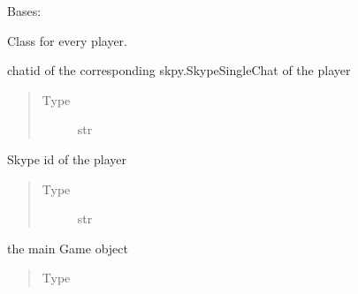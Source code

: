 \documentclass[letterpaper,10pt,english]{sphinxmanual}
\begin{document}
\begin{fulllineitems}
\label{\detokenize{chatwolf:chatwolf.player.Player}}
Bases: 

Class for every player.

\begin{fulllineitems}
\label{\detokenize{chatwolf:chatwolf.player.Player.chatid}}
chatid of the corresponding skpy.SkypeSingleChat of the player
\begin{quote}\begin{description}
\item[{Type}] \leavevmode
str

\end{description}\end{quote}

\end{fulllineitems}


\begin{fulllineitems}
\label{\detokenize{chatwolf:chatwolf.player.Player.id}}
Skype id of the player
\begin{quote}\begin{description}
\item[{Type}] \leavevmode
str

\end{description}\end{quote}

\end{fulllineitems}


\begin{fulllineitems}
\label{\detokenize{chatwolf:chatwolf.player.Player.game}}
the main Game object
\begin{quote}\begin{description}
\item[{Type}] \leavevmode
{\hyperref[\detokenize{chatwolf:chatwolf.game.Game}]{}}


\end{description}
\end{quote}
\end{fulllineitems}
\end{fulllineitems}
\end{document}
